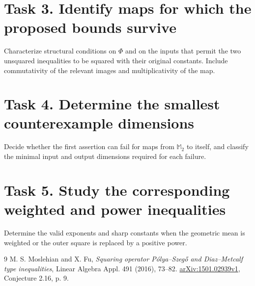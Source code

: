 \documentclass[11pt]{article}
\begin{document}
\section*{Task 3. Identify maps for which the proposed bounds survive}
Characterize structural conditions on $\Phi$ and on the inputs that permit
the two unsquared inequalities to be squared with their original constants.
Include commutativity of the relevant images and multiplicativity of the map.

\section*{Task 4. Determine the smallest counterexample dimensions}
Decide whether the first assertion can fail for maps from $\mathbb M_2$
to itself, and classify the minimal input and output dimensions required
for each failure.

\section*{Task 5. Study the corresponding weighted and power inequalities}
Determine the valid exponents and sharp constants when the geometric mean
is weighted or the outer square is replaced by a positive power.

\begin{thebibliography}{9}
 M. S. Moslehian and X. Fu,
\emph{Squaring operator P\'olya--Szeg\H{o} and Diaz--Metcalf type inequalities},
Linear Algebra Appl. 491 (2016), 73--82.
\href{https://arxiv.org/abs/1501.02939}{arXiv:1501.02939v1},
Conjecture 2.16, p. 9.
\end{thebibliography}
\end{document}
